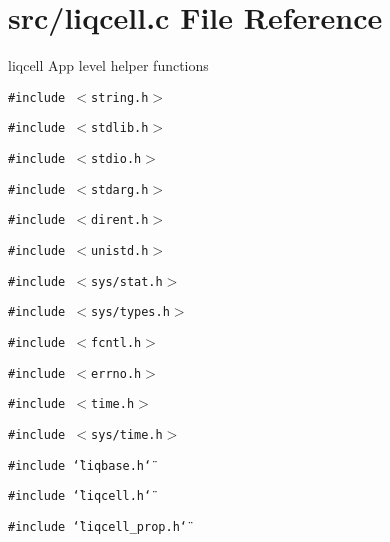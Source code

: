 \section{src/liqcell.c File Reference}
\label{d5/da2/liqcell_8c}
liqcell App level helper functions  


{\tt \#include $<$string.h$>$}\par
{\tt \#include $<$stdlib.h$>$}\par
{\tt \#include $<$stdio.h$>$}\par
{\tt \#include $<$stdarg.h$>$}\par
{\tt \#include $<$dirent.h$>$}\par
{\tt \#include $<$unistd.h$>$}\par
{\tt \#include $<$sys/stat.h$>$}\par
{\tt \#include $<$sys/types.h$>$}\par
{\tt \#include $<$fcntl.h$>$}\par
{\tt \#include $<$errno.h$>$}\par
{\tt \#include $<$time.h$>$}\par
{\tt \#include $<$sys/time.h$>$}\par
{\tt \#include \char`\"{}liqbase.h\char`\"{}}\par
{\tt \#include \char`\"{}liqcell.h\char`\"{}}\par
{\tt \#include \char`\"{}liqcell\_\-prop.h\char`\"{}}\par
